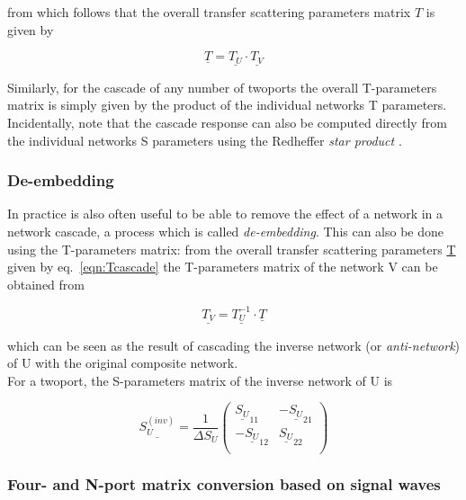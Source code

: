 from which follows that the overall transfer scattering parameters matrix $T$ is given by

\begin{equation}
\label{eqn:Tcascade}
\underline{T} = \underline{T_U} \cdot \underline{T_V}
\end{equation}

Similarly, for the cascade of any number of twoports the overall T-parameters matrix is simply given by the product of the individual networks T parameters.\\
Incidentally, note that the cascade response can also be computed directly from the individual networks S parameters using the Redheffer \textit{star product} \cite{Redheffer}.

\subsubsection{De-embedding}

In practice is also often useful to be able to remove the effect of a network in a network cascade, a process which is called \textit{de-embedding}. This can also be done using the T-parameters matrix: from the overall transfer scattering parameters \underline{T} given by eq.~\eqref{eqn:Tcascade} the T-parameters matrix of the network V can be obtained from

\begin{equation}
\label{eqn:Tdeembedding}
\underline{T_V} = \underline{T_U^{-1}} \cdot \underline{T}
\end{equation}

which can be seen as the result of cascading the inverse network (or \textit{anti-network}) of U with the original composite network.\\
For a twoport, the S-parameters matrix of the inverse network of U is

\begin{equation}
\underline{S_U^{(inv)}}
=
\frac{1}{\Delta S_U}
\begin{pmatrix}
\underline{S_U}_{11} & -\underline{S_U}_{21}\\
-\underline{S_U}_{12} & \underline{S_U}_{22}\\
\end{pmatrix}
\end{equation}

\subsubsection{Four- and N-port matrix conversion based on signal waves}

